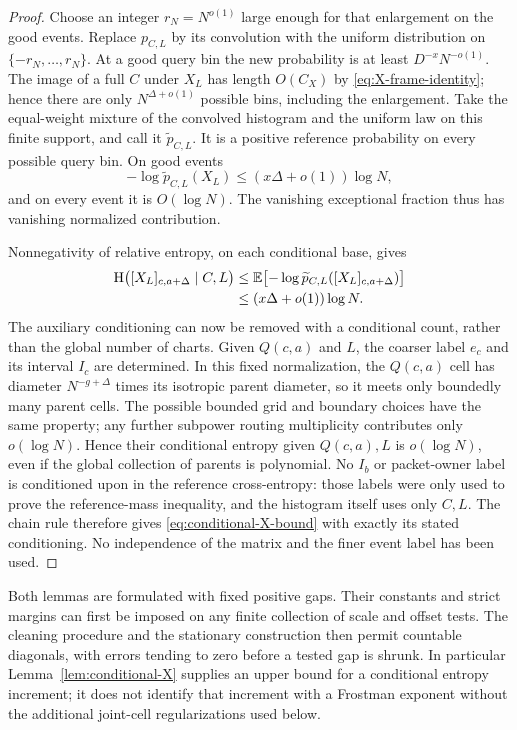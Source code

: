 \begin{proof}
Choose an integer $r_N=N^{o(1)}$ large enough for that enlargement
on the good events. Replace $p_{C,L}$ by its convolution with the
uniform distribution on $\{-r_N,\ldots,r_N\}$. At a good query
bin the new probability is at least $D^{-x}N^{-o(1)}$.
The image of a full $C$ under $X_L$ has length $O(C_X)$ by
\eqref{eq:X-frame-identity}; hence there are only
$N^{\Delta+o(1)}$ possible bins, including the enlargement.
Take the equal-weight mixture of the convolved histogram and the
uniform law on this finite support, and call it $\widetilde p_{C,L}$.
It is a positive reference probability on every possible query
bin. On good events
\[
 -\log\widetilde p_{C,L}(X_L)
 \le (x\Delta+o(1))\log N,
\]
and on every event it is $O(\log N)$. The vanishing exceptional
fraction thus has vanishing normalized contribution.

Nonnegativity of relative entropy, on each conditional base, gives
\begin{align*}
 \mathrm H\bigl([X_L]_{c,a+\Delta}\mid C,L\bigr)
 &\le
 \mathbb E\bigl[-\log\widetilde p_{C,L}
                    ([X_L]_{c,a+\Delta})\bigr]\\
 &\le (x\Delta+o(1))\log N.
\end{align*}
The auxiliary conditioning can now be removed with a conditional
count, rather than the global number of charts. Given $Q(c,a)$ and
$L$, the coarser label $e_c$ and its interval $I_c$ are determined.
In this fixed normalization, the $Q(c,a)$ cell has diameter
$N^{-g+\Delta}$ times its isotropic parent diameter, so it meets
only boundedly many parent cells. The possible bounded grid and
boundary choices have the same property; any further subpower
routing multiplicity contributes only $o(\log N)$. Hence their
conditional entropy given $Q(c,a),L$ is $o(\log N)$, even if the
global collection of parents is polynomial. No $I_b$ or packet-owner
label is conditioned upon in the reference cross-entropy: those
labels were only used to prove the reference-mass inequality, and
the histogram itself uses only $C,L$. The chain rule therefore gives
\eqref{eq:conditional-X-bound} with exactly its stated conditioning.
No independence of the matrix and the finer event label has been used.
\end{proof}

Both lemmas are formulated with fixed positive gaps. Their constants
and strict margins can first be imposed on any finite collection of
scale and offset tests. The cleaning procedure and the stationary
construction then permit countable diagonals, with errors tending to
zero before a tested gap is shrunk. In particular
Lemma~\ref{lem:conditional-X} supplies an upper bound for a
conditional entropy increment; it does not identify that increment
with a Frostman exponent without the additional joint-cell
regularizations used below.
